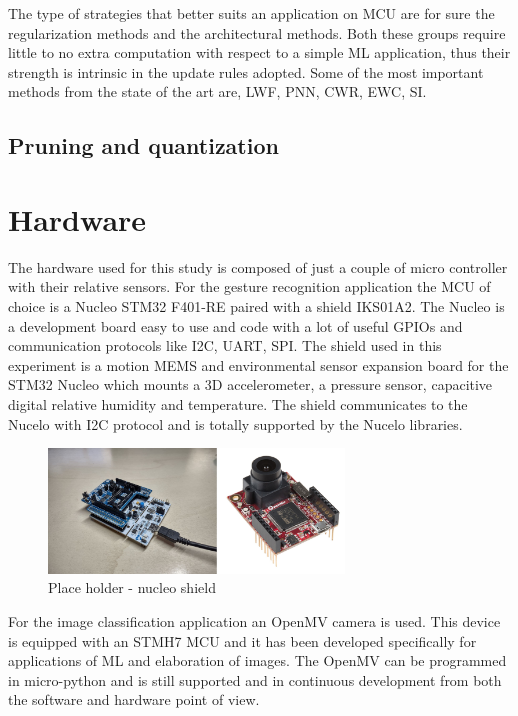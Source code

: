 \documentclass[12pt]{report}
\begin{document}
The type of strategies that better suits an application on MCU are for sure the regularization methods and the architectural methods. Both these groups require little to no extra computation with respect to a simple ML application, thus their strength is intrinsic in the update rules adopted. Some of the most important methods from the state of the art are, LWF, PNN, CWR, EWC, SI. 



\section{Pruning and quantization}





\chapter{Hardware} 
The hardware used for this study is composed of just a couple of micro controller with their relative sensors. For the gesture recognition application the MCU of choice is a Nucleo STM32 F401-RE paired with a shield IKS01A2. The Nucleo is a development board easy to use and code with a lot of useful GPIOs and communication protocols like I2C, UART, SPI. The shield \cite{shield_web_page} used in this experiment is a motion MEMS and environmental sensor expansion board for the STM32 Nucleo which mounts a 3D accelerometer, a pressure sensor, capacitive digital relative humidity and temperature. The shield communicates to the Nucelo with I2C protocol and is totally supported by the Nucelo libraries. 
%
\begin{figure}[h!]
    \centering
    \includegraphics[width=0.7\textwidth]{Figures/Chapter2/hardware.jpg} 
    \caption{Place holder - nucleo shield}
    \label{fig:hardware_stm}    
\end{figure}
%
For the image classification application an OpenMV camera is used. This device is equipped with an STMH7 MCU and it has been developed specifically for applications of ML and elaboration of images. The OpenMV \cite{openmv_web_page} can be programmed in micro-python and is still supported and in continuous development from both the software and hardware point of view. 
\end{document}

